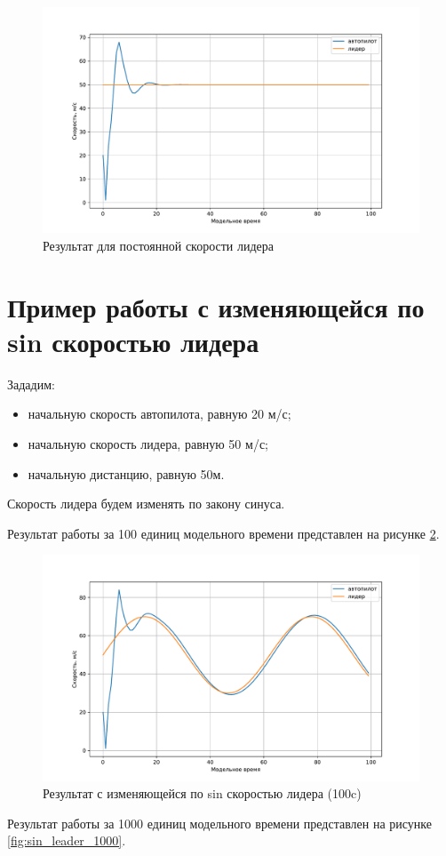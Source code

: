 \documentclass[12pt]{report}
\begin{document}
\begin{figure}[h!]
  \centering
  \includegraphics[scale = 0.6]{result_const_leader.pdf}
  \caption{Результат для постоянной скорости лидера}
  \label{fig:const_leader}
\end{figure}

\section{Пример работы с изменяющейся по sin скоростью лидера}
Зададим:
\begin{itemize}
    \item начальную скорость автопилота, равную 20 м/с;
    \item начальную скорость лидера, равную 50 м/с;
    \item начальную дистанцию, равную 50м.
\end{itemize}

Скорость лидера будем изменять по закону синуса.

Результат работы за 100 единиц модельного времени представлен на рисунке \ref{fig:sin_leader}.

\begin{figure}[h!]
  \centering
  \includegraphics[scale = 0.62]{result_sin_leader.pdf}
  \caption{Результат с изменяющейся по sin скоростью лидера (100c)}
  \label{fig:sin_leader}
\end{figure}
\newpage
Результат работы за 1000 единиц модельного времени представлен на рисунке \ref{fig:sin_leader_1000}.
\end{document}
